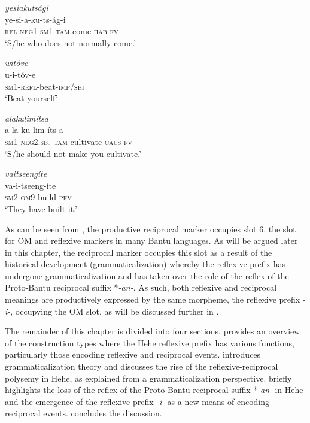 \documentclass[output=paper,
            colorlinks, citecolor=brown
            ,draftmode
		  ]{langscibook}
\begin{document}
\ea\label{ex:ngwasi:4}
\glll \textit{yesiakutsági}\\
ye-si-a-ku-ts-ág-i\\
 \textsc{rel-neg1-sm1-tam}-come-\textsc{hab-fv}\\
 \glt ‘S/he who does not normally come.’

\ex\label{ex:ngwasi:5}
\glll \textit{witóve}\\
 u-i-tóv-e\\
\textsc{sm1-refl}-beat-\textsc{imp/sbj}\\
\glt ‘Beat yourself’

\ex\label{ex:ngwasi:6}
\glll \textit{alakulimítsa}\\
a-la-ku-lim-íts-a\\
\textsc{sm1-neg2.sbj-tam}-cultivate-\textsc{caus-fv}\\
\glt ‘S/he should not make you cultivate.’


\ex\label{ex:ngwasi:7}
\glll \textit{vaitseengíte}\footnotemark{}\\
va-i-tseeng-íte\\
\textsc{sm2-om9}-build-\textsc{pfv}\\
\glt ‘They have built it.’
\z
{}


As can be seen from , the productive reciprocal marker occupies slot 6, the slot for OM and reflexive markers in many Bantu languages. As will be argued later in this chapter, the reciprocal marker occupies this slot as a result of the historical development (grammaticalization) whereby the reflexive prefix has undergone grammaticalization and has taken over the role of the reflex of the Proto-Bantu reciprocal suffix *\textit{\nobreakdash-an-}. As such, both reflexive and reciprocal meanings are productively expressed by the same morpheme, the reflexive prefix -\textit{i-}, occupying the OM slot, as will be discussed further in .

The remainder of this chapter is divided into four sections.  provides an overview of the construction types where the Hehe reflexive prefix has various functions, particularly those encoding reflexive and reciprocal events.  introduces grammaticalization theory and discusses the rise of the reflexive-reciprocal polysemy in Hehe, as explained from a grammaticalization perspective.  briefly highlights the loss of the reflex of the Proto-Bantu reciprocal suffix *-\textit{an}{}- in Hehe and the emergence of the reflexive prefix -\textit{i}{}- as a new means of encoding reciprocal events.  concludes the discussion.
\end{document}
